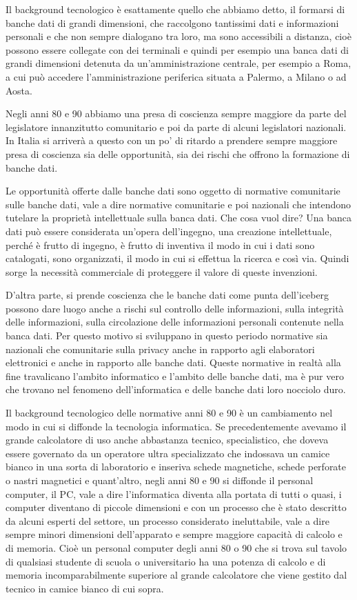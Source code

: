 Il background tecnologico è esattamente quello che abbiamo detto, il formarsi di banche dati di grandi dimensioni, che raccolgono tantissimi dati e informazioni personali e che non sempre dialogano tra loro, ma sono accessibili a distanza, cioè possono essere collegate con dei terminali e quindi per esempio una banca dati di grandi dimensioni detenuta da un'amministrazione centrale, per esempio a Roma, a cui può accedere l'amministrazione periferica situata a Palermo, a Milano o ad Aosta. 

Negli anni 80 e 90 abbiamo una presa di coscienza sempre maggiore da parte del legislatore innanzitutto comunitario e poi da parte di alcuni legislatori nazionali. In Italia si arriverà a questo con un po' di ritardo a prendere sempre maggiore presa di coscienza sia delle opportunità, sia dei rischi che offrono la formazione di banche dati.

Le opportunità offerte dalle banche dati sono oggetto di normative comunitarie sulle banche dati, vale a dire normative comunitarie  e poi nazionali che intendono tutelare la proprietà intellettuale sulla banca dati. Che cosa vuol dire? Una banca dati può essere considerata un'opera dell'ingegno, una creazione intellettuale, perché è frutto di ingegno, è frutto di inventiva il modo in cui i dati sono catalogati, sono organizzati, il modo in cui si effettua la ricerca e così via. Quindi sorge la necessità commerciale di proteggere il valore di queste invenzioni.

D'altra parte, si prende coscienza che le banche dati come punta dell'iceberg possono dare luogo anche a rischi sul controllo delle informazioni, sulla integrità delle informazioni, sulla circolazione delle informazioni personali contenute nella banca dati. Per questo motivo si sviluppano in questo periodo normative  sia nazionali che comunitarie sulla privacy anche in rapporto agli elaboratori elettronici e anche in rapporto alle banche dati. 
Queste normative in realtà alla fine travalicano l'ambito informatico e l'ambito delle banche dati, ma è pur vero che trovano nel fenomeno dell'informatica e delle banche dati loro nocciolo duro.

Il background tecnologico delle normative anni 80 e 90 è un cambiamento nel modo in cui si diffonde la tecnologia informatica. Se precedentemente avevamo il grande calcolatore di uso anche abbastanza tecnico, specialistico, che doveva essere governato da un operatore ultra specializzato che indossava un camice bianco in una sorta di laboratorio e inseriva schede magnetiche, schede perforate o nastri magnetici e quant'altro, negli anni 80 e 90 si diffonde il personal computer, il PC, vale a dire l'informatica diventa alla portata di tutti o quasi, i computer diventano di piccole dimensioni e con un processo che è stato descritto da alcuni esperti del settore, un processo considerato ineluttabile, vale a dire sempre minori dimensioni dell'apparato e sempre maggiore capacità di calcolo e di memoria. Cioè un personal computer degli anni 80 o 90 che si trova sul tavolo di qualsiasi studente di scuola o universitario ha una potenza di calcolo e di memoria incomparabilmente superiore al grande calcolatore che viene gestito dal tecnico in camice bianco di cui sopra.

